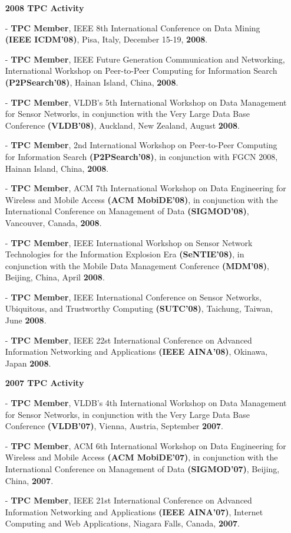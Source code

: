 \documentclass[10pt]{article}
\begin{document}
\begin{itemize}
\begin{itemize}
%
\vspace{0.1in}
\item[]{\bf 2008 TPC Activity\hrulefill }
%
\item[-] {\bf TPC Member}, IEEE 8th International Conference on Data Mining {\bf (IEEE ICDM'08)}, Pisa, Italy, December 15-19, {\bf 2008}.
\item[-] {\bf TPC Member}, IEEE Future Generation Communication and Networking, International Workshop on Peer-to-Peer Computing for Information Search {\bf (P2PSearch'08)}, Hainan Island, China, {\bf 2008}.
\item[-] {\bf TPC Member}, VLDB's 5th International Workshop on Data Management for Sensor Networks, in conjunction with the Very Large Data Base Conference {\bf (VLDB'08)}, Auckland, New Zealand, August {\bf 2008}.
\item[-] {\bf TPC Member}, 2nd International Workshop on Peer-to-Peer Computing for Information Search {\bf (P2PSearch'08)}, in conjunction with FGCN 2008, Hainan Island, China, {\bf 2008}.
\item[-] {\bf TPC Member}, ACM 7th International Workshop on Data Engineering for Wireless and Mobile Access {\bf (ACM MobiDE'08)}, in conjunction with the International Conference on Management of Data {\bf (SIGMOD'08)}, Vancouver, Canada, {\bf 2008}.
\item[-] {\bf TPC Member}, IEEE International Workshop on Sensor Network Technologies for the Information Explosion Era {\bf (SeNTIE'08)}, in conjunction with the Mobile Data Management Conference {\bf (MDM'08)}, Beijing, China, April {\bf 2008}.
\item[-] {\bf TPC Member}, IEEE International Conference on Sensor Networks, Ubiquitous, and Trustworthy Computing {\bf (SUTC'08)}, Taichung, Taiwan, June {\bf 2008}.
\item[-] {\bf TPC Member}, IEEE 22st International Conference on Advanced Information Networking and Applications {\bf (IEEE AINA'08)}, Okinawa, Japan {\bf 2008}.

%
\vspace{0.1in}
\item[]{\bf 2007 TPC Activity\hrulefill }
%
\item[-] {\bf TPC Member}, VLDB's 4th International Workshop on Data Management for Sensor Networks, in conjunction with the Very Large Data Base Conference {\bf (VLDB'07)}, Vienna, Austria, September {\bf 2007}.
\item[-] {\bf TPC Member}, ACM 6th International Workshop on Data Engineering for Wireless and Mobile Access {\bf (ACM MobiDE'07)}, in conjunction with the International Conference on Management of Data {\bf (SIGMOD'07)}, Beijing, China, {\bf 2007}.
\item[-] {\bf TPC Member}, IEEE 21st International Conference on Advanced Information Networking and Applications {\bf (IEEE AINA'07)}, Internet Computing and Web Applications, Niagara Falls, Canada, {\bf 2007}.
\end{itemize}


\end{itemize}
\end{document}
